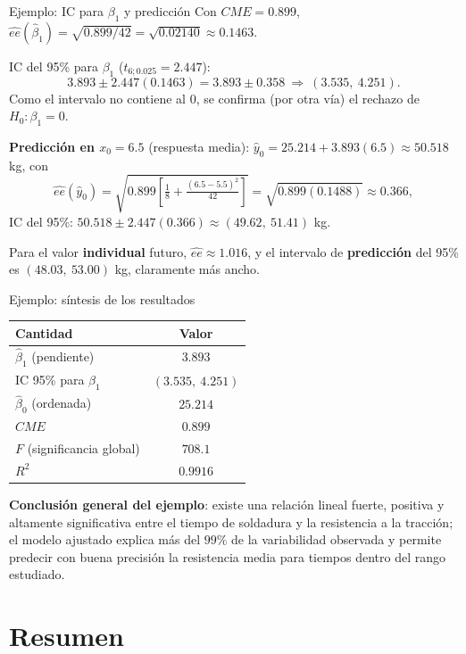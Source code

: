 \documentclass[aspectratio=169,11pt]{beamer}
\begin{document}
\begin{frame}{Ejemplo: IC para $\beta_1$ y predicción}
Con $CME=0.899$, $\widehat{ee}(\hat\beta_1)=\sqrt{0.899/42}=\sqrt{0.02140}\approx0.1463$.

IC del 95\% para $\beta_1$ ($t_{6;0.025}=2.447$):
\[
3.893 \pm 2.447(0.1463) = 3.893\pm0.358 \ \Rightarrow\ (3.535,\ 4.251).
\]
Como el intervalo no contiene al $0$, se confirma (por otra vía) el rechazo de $H_0:\beta_1=0$.

\textbf{Predicción en $x_0=6.5$} (respuesta media): $\hat y_0 = 25.214+3.893(6.5)\approx50.518$ kg, con
\[
\widehat{ee}(\hat y_0)=\sqrt{0.899\left[\tfrac18+\tfrac{(6.5-5.5)^2}{42}\right]} = \sqrt{0.899(0.1488)}\approx0.366,
\]
IC del 95\%: $50.518\pm2.447(0.366) \approx (49.62,\ 51.41)$ kg.

Para el valor \textbf{individual} futuro, $\widehat{ee}\approx1.016$, y el intervalo de \textbf{predicción} del 95\% es $(48.03,\ 53.00)$ kg, claramente más ancho.
\end{frame}

\begin{frame}{Ejemplo: síntesis de los resultados}
\begin{table}[htbp]
\centering
\begin{tabular}{lc}
\toprule
Cantidad & Valor \\
\midrule
$\hat\beta_1$ (pendiente) & $3.893$ \\
IC 95\% para $\beta_1$ & $(3.535,\ 4.251)$ \\
$\hat\beta_0$ (ordenada) & $25.214$ \\
$CME$ & $0.899$ \\
$F$ (significancia global) & $708.1$ \\
$R^2$ & $0.9916$ \\
\bottomrule
\end{tabular}
\end{table}

\textbf{Conclusión general del ejemplo}: existe una relación lineal fuerte, positiva y altamente significativa entre el tiempo de soldadura y la resistencia a la tracción; el modelo ajustado explica más del $99\%$ de la variabilidad observada y permite predecir con buena precisión la resistencia media para tiempos dentro del rango estudiado.
\end{frame}

\section{Resumen}
\end{document}
